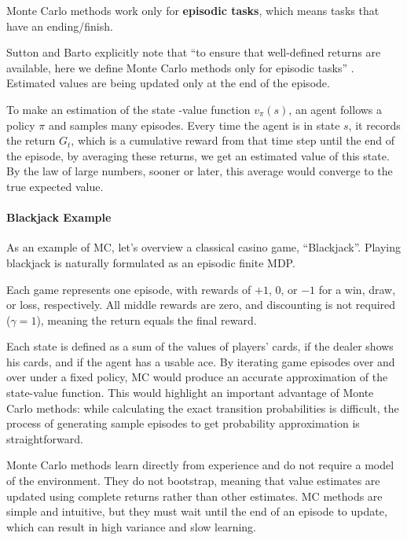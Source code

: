 Monte Carlo methods work only for \textbf{episodic tasks}, which means tasks that have an ending/finish.

  Sutton and Barto explicitly note that “to ensure that well-defined returns are available, here we define Monte Carlo methods only for episodic tasks” \cite{sutton}. Estimated values are being updated only at the end of the episode.

To make an estimation of the state -value function $v_\pi(s)$, an agent follows a policy $\pi$ and samples many episodes. Every time the agent is in state $s$, it records the return  $G_t$, which is a cumulative reward from that time step until the end of the episode, by averaging these returns, we get an estimated value of this state.  By the law of large numbers, sooner or later, this average would converge to the true expected value. 


\paragraph{Blackjack Example}  

As an example of MC, let's overview a classical casino game, “Blackjack”. Playing blackjack is naturally formulated as an episodic finite MDP. \cite{sutton}

Each game represents one episode, with rewards of $+1$, $0$, or $-1$ for a win, draw, or loss, respectively. All middle rewards are zero, and discounting is not required ($\gamma = 1$), meaning the return equals the final reward.

Each state is defined as a sum of the values of players' cards, if the dealer shows his cards, and if the agent has a usable ace. By iterating game episodes over and over under a fixed policy, MC would produce an accurate approximation of the state-value function. This would highlight an important advantage of Monte Carlo methods: while calculating the exact transition probabilities is difficult, the process of generating sample episodes to get probability approximation is straightforward.

Monte Carlo methods learn directly from experience and do not require a model of the environment. They do not bootstrap, meaning that value estimates are updated using complete returns rather than other estimates. MC methods are simple and intuitive, but they must wait until the end of an episode to update, which can result in high variance and slow learning. 


